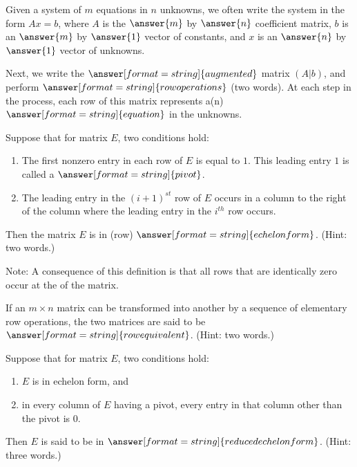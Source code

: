 \documentclass{ximera}
\begin{document}
\begin{question}
Given a system of $m$ equations in $n$ unknowns, we often write the system in the form $Ax=b$, where $A$ is the $\answer{m}$ by $\answer{n}$ coefficient matrix, 
$b$ is an $\answer{m}$ by $\answer{1}$ vector of constants, and $x$ is an $\answer{n}$ by $\answer{1}$ vector of unknowns. 

Next, we write the $\answer[format=string]{augmented}$ matrix $(A|b)$, and perform $\answer[format=string]{row operations}$ (two words).  At each step in the process, 
each row of this matrix represents a(n) $\answer[format=string]{equation}$ in the unknowns.  
\end{question}


\begin{question}
Suppose that for matrix $E$, two conditions hold:
\begin{enumerate}
\item The first nonzero entry in each row of $E$ is equal to $1$. This leading entry $1$ is called a 
$\answer[format=string]{pivot}$.
\item The leading entry in the $(i + 1)^{st}$ row of $E$ occurs in a column to the right of the column where the leading entry in the $i^{th}$ row occurs.
\end{enumerate}
Then the matrix $E$ is in (row) $\answer[format=string]{echelon form}$.  (Hint: two words.)

Note: A consequence of this definition is that all rows that are identically zero occur at the  of the matrix.
\end{question} 

\begin{question}
If an $m \times n$ matrix can be transformed into another by a sequence of elementary row operations, the two matrices are said to be $\answer[format=string]{row equivalent}$.  (Hint: two words.)
\end{question} 

\begin{question}
Suppose that for matrix $E$, two conditions hold:
\begin{enumerate}
\item $E$ is in echelon form, and
\item in every column of $E$ having a pivot, every entry in that column other than the pivot is $0$.
\end{enumerate}
Then $E$ is said to be in $\answer[format=string]{reduced echelon form}$.  (Hint: three words.) 
\end{question} 
\end{document}
